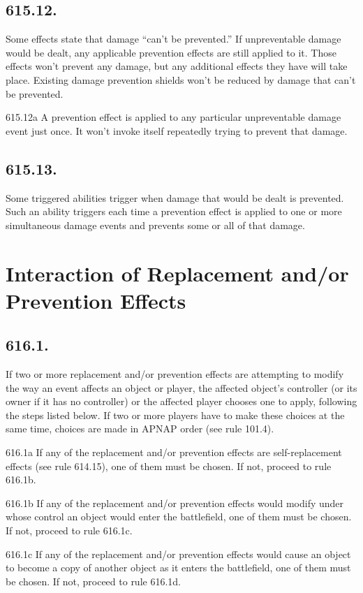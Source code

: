 \subsection*{615.12.}
Some effects state that damage “can’t be prevented.” If unpreventable damage would be dealt, any applicable prevention effects are still applied to it. Those effects won’t prevent any damage, but any additional effects they have will take place. Existing damage prevention shields won’t be reduced by damage that can’t be prevented.

615.12a A prevention effect is applied to any particular unpreventable damage event just once. It won’t invoke itself repeatedly trying to prevent that damage.

\subsection*{615.13.}
Some triggered abilities trigger when damage that would be dealt is prevented. Such an ability triggers each time a prevention effect is applied to one or more simultaneous damage events and prevents some or all of that damage.

\section{Interaction of Replacement and/or Prevention Effects}
\subsection*{616.1.}
If two or more replacement and/or prevention effects are attempting to modify the way an event affects an object or player, the affected object’s controller (or its owner if it has no controller) or the affected player chooses one to apply, following the steps listed below. If two or more players have to make these choices at the same time, choices are made in APNAP order (see rule 101.4).

616.1a If any of the replacement and/or prevention effects are self-replacement effects (see rule 614.15), one of them must be chosen. If not, proceed to rule 616.1b.

616.1b If any of the replacement and/or prevention effects would modify under whose control an object would enter the battlefield, one of them must be chosen. If not, proceed to rule 616.1c.

616.1c If any of the replacement and/or prevention effects would cause an object to become a copy of another object as it enters the battlefield, one of them must be chosen. If not, proceed to rule 616.1d.

